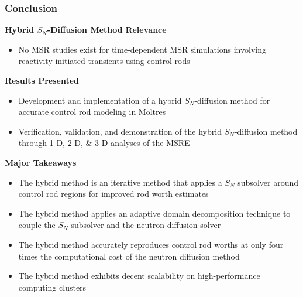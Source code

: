 \begin{frame}
  \frametitle{Conclusion}
  \begin{block}{\textbf{Hybrid $S_N$-Diffusion Method}}
    \textbf{Relevance}
    \begin{itemize}
      \item No MSR studies exist for time-dependent MSR simulations involving reactivity-initiated
        transients using control rods
    \end{itemize}
    \textbf{Results Presented}
    \begin{itemize}
      \item Development and implementation of a hybrid $S_N$-diffusion method for
        accurate control rod modeling in Moltres
      \item Verification, validation, and demonstration of the hybrid $S_N$-diffusion
        method through 1-D, 2-D, \& 3-D analyses of the MSRE
    \end{itemize}
    \textbf{Major Takeaways}
    \begin{itemize}
      \item The hybrid method is an iterative method that applies a $S_N$ subsolver around control
        rod regions for improved rod worth estimates
      \item The hybrid method applies an adaptive domain decomposition technique to
        couple the $S_N$ subsolver and the neutron diffusion solver
      \item The hybrid method accurately reproduces control rod worths at only four times the
        computational cost of the neutron diffusion method
      \item The hybrid method exhibits decent scalability on high-performance computing clusters
    \end{itemize}
  \end{block}
\end{frame}
